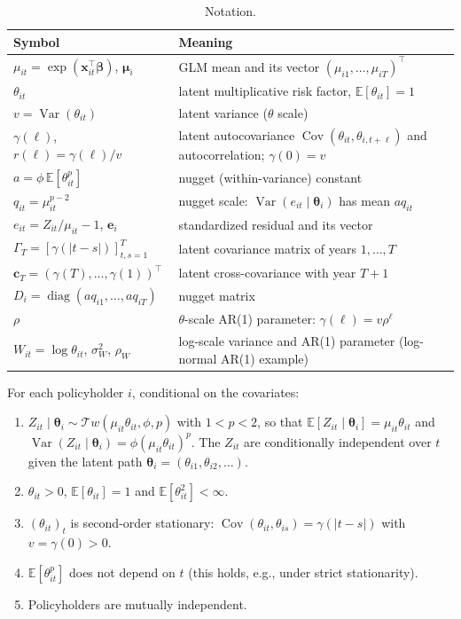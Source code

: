 \documentclass[mathematics,article,submit,moreauthors]{Definitions/mdpi}
\DeclareMathOperator{\Var}{Var}
\DeclareMathOperator{\Cov}{Cov}
\DeclareMathOperator{\diag}{diag}
\newcommand{\E}{\mathbb{E}}
\newcommand{\Tw}{\mathcal{T}w}
\newcommand{\bmu}{\boldsymbol{\mu}}
\newcommand{\be}{\boldsymbol{e}}
\newcommand{\bc}{\boldsymbol{c}}
\newcommand{\bx}{\boldsymbol{x}}
\newcommand{\bbeta}{\boldsymbol{\beta}}
\begin{document}
\begin{table}[H]
\caption{Notation.\label{tab:notation}}
\begin{tabularx}{\textwidth}{l>{\raggedright\arraybackslash}X}
\toprule
\textbf{Symbol} & \textbf{Meaning} \\
\midrule
$\mu_{it}=\exp(\bx_{it}^\top\bbeta)$, $\bmu_i$ & GLM mean and its vector $(\mu_{i1},\dots,\mu_{iT})^\top$ \\
$\theta_{it}$ & latent multiplicative risk factor, $\E[\theta_{it}]=1$ \\
$v=\Var(\theta_{it})$ & latent variance ($\theta$ scale) \\
$\gamma(\ell)$, $r(\ell)=\gamma(\ell)/v$ & latent autocovariance $\Cov(\theta_{it},\theta_{i,t+\ell})$ and autocorrelation; $\gamma(0)=v$ \\
$a=\phi\,\E[\theta_{it}^p]$ & nugget (within-variance) constant \\
$q_{it}=\mu_{it}^{p-2}$ & nugget scale: $\Var(e_{it}\mid\boldsymbol\theta_i)$ has mean $a q_{it}$ \\
$e_{it}=Z_{it}/\mu_{it}-1$, $\be_i$ & standardized residual and its vector \\
$\Gamma_T=[\gamma(|t-s|)]_{t,s=1}^T$ & latent covariance matrix of years $1,\dots,T$ \\
$\bc_T=(\gamma(T),\dots,\gamma(1))^\top$ & latent cross-covariance with year $T+1$ \\
$D_{i}=\diag(a q_{i1},\dots,a q_{iT})$ & nugget matrix \\
$\rho$ & $\theta$-scale AR(1) parameter: $\gamma(\ell)=v\rho^\ell$ \\
$W_{it}=\log\theta_{it}$, $\sigma_W^2$, $\rho_W$ & log-scale variance and AR(1) parameter (log-normal AR(1) example) \\
\bottomrule
\end{tabularx}
\end{table}

\begin{Assumption}\label{ass:model}
For each policyholder $i$, conditional on the covariates:
\begin{enumerate}
\item[(A1)] $Z_{it}\mid\boldsymbol{\theta}_i\sim\Tw(\mu_{it}\theta_{it},\phi,p)$ with $1<p<2$, so that $\E[Z_{it}\mid\boldsymbol\theta_i]=\mu_{it}\theta_{it}$ and $\Var(Z_{it}\mid\boldsymbol\theta_i)=\phi(\mu_{it}\theta_{it})^p$. The $Z_{it}$ are conditionally independent over $t$ given the latent path $\boldsymbol\theta_i=(\theta_{i1},\theta_{i2},\dots)$.
\item[(A2)] $\theta_{it}>0$, $\E[\theta_{it}]=1$ and $\E[\theta_{it}^2]<\infty$.
\item[(A3)] $(\theta_{it})_t$ is second-order stationary: $\Cov(\theta_{it},\theta_{is})=\gamma(|t-s|)$ with $v=\gamma(0)>0$.
\item[(A4)] $\E[\theta_{it}^p]$ does not depend on $t$ (this holds, e.g., under strict stationarity).
\item[(A5)] Policyholders are mutually independent.
\end{enumerate}
\end{Assumption}
\end{document}
